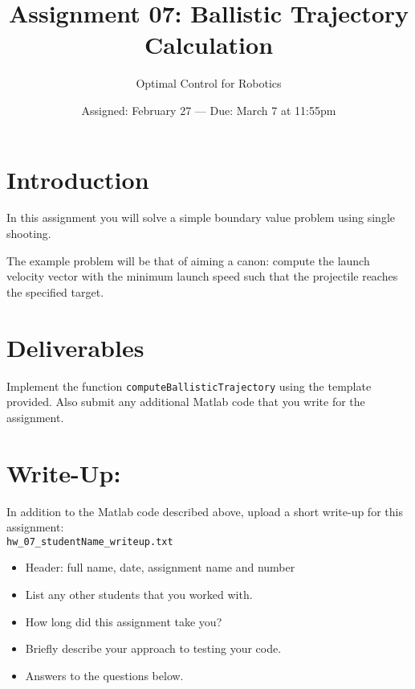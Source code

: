 

\title{Assignment 07:  Ballistic Trajectory Calculation}
\date{Assigned:  February 27  ---  Due:  March 7 at 11:55pm}
\author{Optimal Control for Robotics}

\maketitle

\section*{Introduction}

In this assignment you will solve a simple boundary value problem using single shooting.

The example problem will be that of aiming a canon:
compute the launch velocity vector with the minimum launch speed
such that the projectile reaches the specified target.

\section*{Deliverables}

Implement the function \texttt{computeBallisticTrajectory} using the template provided.
Also submit any additional Matlab code that you write for the assignment.

\section*{Write-Up:}

In addition to the Matlab code described above,
upload a short write-up for this assignment: \\
\texttt{hw\_07\_studentName\_writeup.txt}
\vspace{-0.0em} \begin{itemize}  \setlength\itemsep{0em} \setlength\itemindent{18pt}
  \item Header: full name, date, assignment name and number
  \item List any other students that you worked with.
  \item How long did this assignment take you?
  \item Briefly describe your approach to testing your code.
  \item Answers to the questions below.
\end{itemize}

